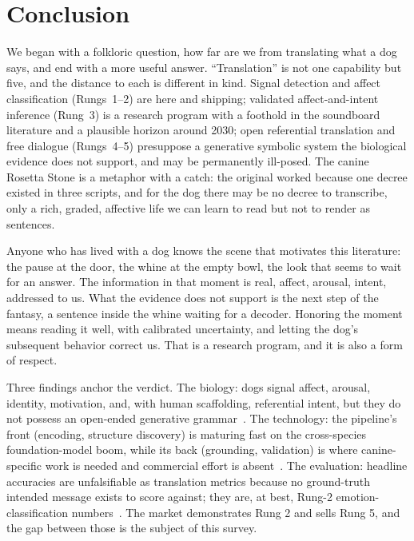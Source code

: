 \section{Conclusion}
\label{sec:conclusion}

We began with a folkloric question, how far are we from translating what a
dog says, and end with a more useful answer. ``Translation'' is not one
capability but five, and the distance to each is different in kind. Signal
detection and affect classification (Rungs~1--2) are here and shipping;
validated affect-and-intent inference (Rung~3) is a research program with a
foothold in the soundboard literature and a plausible horizon around 2030;
open referential translation and free dialogue (Rungs~4--5) presuppose a
generative symbolic system the biological evidence does not support, and
may be permanently ill-posed. The canine Rosetta Stone is a metaphor with a
catch: the original worked because one decree existed in three scripts, and
for the dog there may be no decree to transcribe, only a rich, graded,
affective life we can learn to read but not to render as sentences.

Anyone who has lived with a dog knows the scene that motivates this
literature: the pause at the door, the whine at the empty bowl, the look
that seems to wait for an answer. The information in that moment is real,
affect, arousal, intent, addressed to us. What the evidence does not support
is the next step of the fantasy, a sentence inside the whine waiting for a
decoder. Honoring the moment means reading it well, with calibrated
uncertainty, and letting the dog's subsequent behavior correct us. That is
a research program, and it is also a form of respect.

Three findings anchor the verdict. The biology: dogs signal affect,
arousal, identity, motivation, and, with human scaffolding, referential
intent, but they do not possess an open-ended generative
grammar~\cite{pongracz2005barks,farago2017growls,waller2013dogfacs,bastos2024scirep}.
The technology: the pipeline's front (encoding, structure discovery) is
maturing fast on the cross-species foundation-model boom, while its back
(grounding, validation) is where canine-specific work is needed and
commercial effort is
absent~\cite{hagiwara2023aves,robinson2024naturelm,sharma2024whale,google2025dolphingemma}.
The evaluation: headline accuracies are unfalsifiable as translation
metrics because no ground-truth intended message exists to score against;
they are, at best, Rung-2 emotion-classification
numbers~\cite{icassp2018dogbark}. The market demonstrates Rung 2 and sells
Rung 5, and the gap between those is the subject of this survey.

